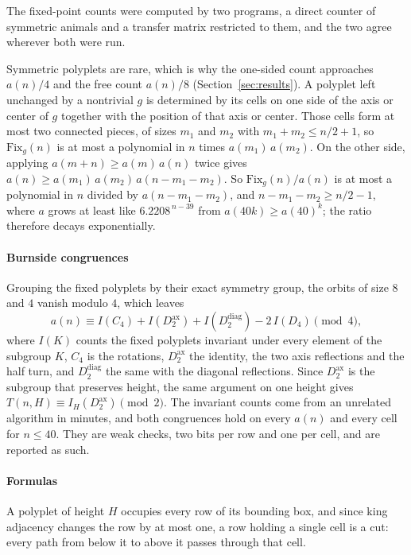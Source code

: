 \documentclass[11pt]{article}
\begin{document}
The fixed-point counts were computed by two programs, a direct counter of
symmetric animals and a transfer matrix restricted to them, and the two agree
wherever both were run.

Symmetric polyplets are rare, which is why the one-sided count approaches
$a(n)/4$ and the free count $a(n)/8$ (Section~\ref{sec:results}). A polyplet
left unchanged by a nontrivial $g$ is determined by its cells on one side of
the axis or center of $g$ together with the position of that axis or center.
Those cells form at most two connected pieces, of sizes $m_1$ and $m_2$ with
$m_1 + m_2 \le n/2 + 1$, so $\mathrm{Fix}_g(n)$ is at most a polynomial in
$n$ times $a(m_1)\,a(m_2)$. On the other side, applying $a(m+n) \ge
a(m)\,a(n)$ twice gives $a(n) \ge a(m_1)\,a(m_2)\,a(n - m_1 - m_2)$. So
$\mathrm{Fix}_g(n)/a(n)$ is at most a polynomial in $n$ divided by
$a(n - m_1 - m_2)$, and $n - m_1 - m_2 \ge n/2 - 1$, where $a$ grows at least
like $6.2208^{\,n-39}$ from $a(40k) \ge a(40)^k$; the ratio therefore decays
exponentially.

\paragraph{Burnside congruences} Grouping the fixed polyplets by their exact
symmetry group, the orbits of size $8$ and $4$ vanish modulo $4$, which leaves
\[ a(n) \equiv I(C_4) + I(D_2^{\mathrm{ax}}) + I(D_2^{\mathrm{diag}})
   - 2\,I(D_4) \pmod 4, \]
where $I(K)$ counts the fixed polyplets invariant under every element of the
subgroup $K$, $C_4$ is the rotations, $D_2^{\mathrm{ax}}$ the identity, the two
axis reflections and the half turn, and $D_2^{\mathrm{diag}}$ the same with
the diagonal reflections. Since $D_2^{\mathrm{ax}}$ is the subgroup that
preserves height, the same argument on one height gives $T(n,H) \equiv
I_H(D_2^{\mathrm{ax}}) \pmod 2$. The invariant counts come from an unrelated
algorithm in minutes, and both congruences hold on every $a(n)$ and every cell
for $n \le 40$. They are weak checks, two bits per row and one per cell, and
are reported as such.

\paragraph{Formulas}
\label{sec:formulas}
A polyplet of height $H$ occupies every row of its bounding box, and since
king adjacency changes the row by at most one, a row holding a single cell is
a cut: every path from below it to above it passes through that cell.
\end{document}
